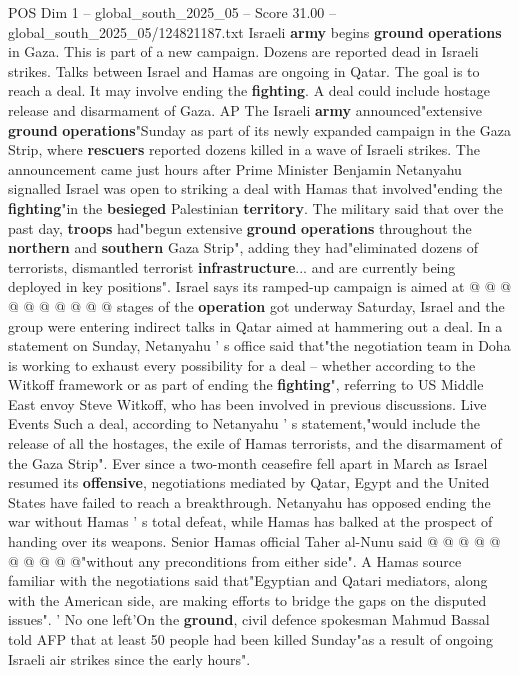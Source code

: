 \begin{textsample}{POS Dim 1 – global\_south\_2025\_05 – Score 31.00 – global\_south\_2025\_05/124821187.txt}  \label{ex:f1_pos_065}
Israeli \textbf{army} begins \textbf{ground} \textbf{operations} in Gaza.
This is part of a new campaign.
Dozens are reported dead in Israeli strikes.
Talks between Israel and Hamas are ongoing in Qatar.
The goal is to reach a deal.
It may involve ending the \textbf{fighting}.
A deal could include hostage release and disarmament of Gaza.
AP The Israeli \textbf{army} announced"extensive \textbf{ground} \textbf{operations}"Sunday as part of its newly expanded campaign in the Gaza Strip, where \textbf{rescuers} reported dozens killed in a wave of Israeli strikes.
The announcement came just hours after Prime Minister Benjamin Netanyahu signalled Israel was open to striking a deal with Hamas that involved"ending the \textbf{fighting}"in the \textbf{besieged} Palestinian \textbf{territory}.
The military said that over the past day, \textbf{troops} had"begun extensive \textbf{ground} \textbf{operations} throughout the \textbf{northern} and \textbf{southern} Gaza Strip", adding they had"eliminated dozens of terrorists, dismantled terrorist \textbf{infrastructure}... and are currently being deployed in key positions".
Israel says its ramped-up campaign is aimed at @ @ @ @ @ @ @ @ @ @ stages of the \textbf{operation} got underway Saturday, Israel and the group were entering indirect talks in Qatar aimed at hammering out a deal.
In a statement on Sunday, Netanyahu ' s office said that"the negotiation team in Doha is working to exhaust every possibility for a deal -- whether according to the Witkoff framework or as part of ending the \textbf{fighting}", referring to US Middle East envoy Steve Witkoff, who has been involved in previous discussions.
Live Events Such a deal, according to Netanyahu ' s statement,"would include the release of all the hostages, the exile of Hamas terrorists, and the disarmament of the Gaza Strip".
Ever since a two-month ceasefire fell apart in March as Israel resumed its \textbf{offensive}, negotiations mediated by Qatar, Egypt and the United States have failed to reach a breakthrough.
Netanyahu has opposed ending the war without Hamas ' s total defeat, while Hamas has balked at the prospect of handing over its weapons.
Senior Hamas official Taher al-Nunu said @ @ @ @ @ @ @ @ @ @"without any preconditions from either side".
A Hamas source familiar with the negotiations said that"Egyptian and Qatari mediators, along with the American side, are making efforts to bridge the gaps on the disputed issues". ' No one left'On the \textbf{ground}, civil defence spokesman Mahmud Bassal told AFP that at least 50 people had been killed Sunday"as a result of ongoing Israeli air strikes since the early hours".

\end{textsample}
